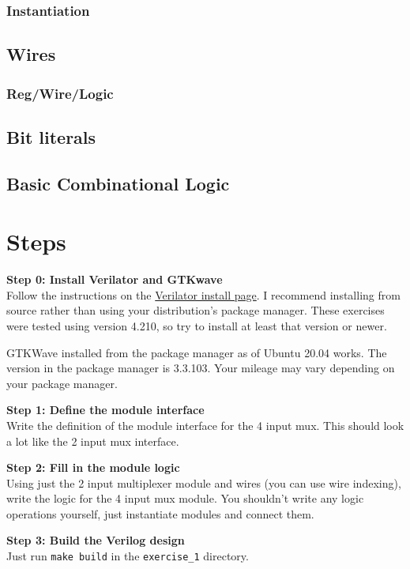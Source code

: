 \documentclass{article}
\begin{document}
\subsubsection*{Instantiation}
\subsection*{Wires}
\subsubsection*{Reg/Wire/Logic}
\subsection*{Bit literals}
\subsection*{Basic Combinational Logic}

\section*{Steps}
\textbf{Step 0: Install Verilator and GTKwave}\\
Follow the instructions on the
\hyperlink{https://veripool.org/guide/latest/install.html}{Verilator install
page}. I recommend installing from source rather than using your distribution's
package manager. These exercises were tested using version 4.210, so try to
install at least that version or newer.

GTKWave installed from the package manager as of Ubuntu 20.04 works. The version
in the package manager is 3.3.103. Your mileage may vary depending on your
package manager.

\noindent\textbf{Step 1: Define the module interface}\\
Write the definition of the module interface for the 4 input mux. This should
look a lot like the 2 input mux interface.


\noindent\textbf{Step 2: Fill in the module logic}\\
Using just the 2 input multiplexer module and wires (you can use wire indexing),
write the logic for the 4 input mux module. You shouldn't write any
logic operations yourself, just instantiate modules and connect them.

\noindent\textbf{Step 3: Build the Verilog design}\\
Just run \texttt{make build} in the \texttt{exercise\_1} directory.
\end{document}
